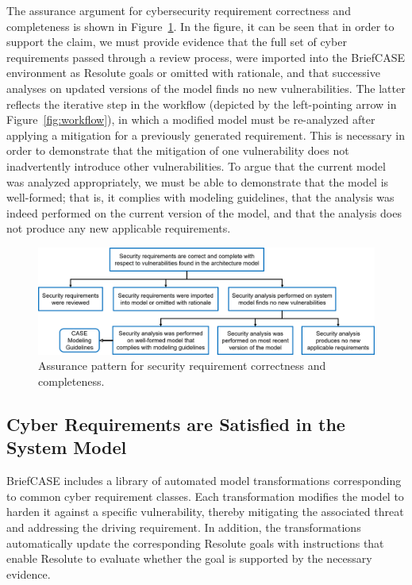 The assurance argument for cybersecurity requirement correctness and completeness is shown in Figure~\ref{fig:req-correct-complete}.  
%
In the figure, it can be seen that in order to support the claim, we must provide evidence that the full set of cyber requirements passed through a review process, were imported into the BriefCASE environment as Resolute goals or omitted with rationale, and that successive analyses on updated versions of the model finds no new vulnerabilities.  The latter reflects the iterative step in the workflow (depicted by the left-pointing arrow in Figure~\ref{fig:workflow}), in which a modified model must be re-analyzed after applying a mitigation for a previously generated requirement.  This is necessary in order to demonstrate that the mitigation of one vulnerability does not inadvertently introduce other vulnerabilities.  To argue that the current model was analyzed appropriately, we must be able to demonstrate that the model is well-formed; that is, it complies with modeling guidelines, that the analysis was indeed performed on the current version of the model, and that the analysis does not produce any new applicable requirements.

\begin{figure}[h] 
	\centering 
	\includegraphics[width=\textwidth]{figs/req-correct-complete.png}
	\caption{Assurance pattern for security requirement correctness and completeness.}
	\label{fig:req-correct-complete} 
\end{figure}

\subsection{Cyber Requirements are Satisfied in the System Model}
\label{sec:requirements-satisfied-in-model}
BriefCASE includes a library of automated model transformations corresponding to common cyber requirement classes.  Each transformation modifies the model to harden it against a specific vulnerability, thereby mitigating the associated threat and addressing the driving requirement.  In addition, the transformations automatically update the corresponding Resolute goals with instructions that enable Resolute to evaluate whether the goal is supported by the necessary evidence.

